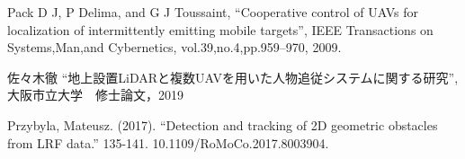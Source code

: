 \documentclass[autodetect-engine,dvipdfmx-if-dvi,ja=standard,a4j,jbase=11pt,magstyle=nomag*]{bxjsreport}
\begin{document}
\begin{thebibliography}{99}
Pack D J, P Delima, and G J Toussaint, ``Cooperative control of UAVs for localization of intermittently emitting mobile targets'', IEEE Transactions on Systems,Man,and Cybernetics, vol.39,no.4,pp.959--970, 2009.

佐々木徹 ``地上設置LiDARと複数UAVを用いた人物追従システムに関する研究'', 大阪市立大学　修士論文，2019

Przybyla, Mateusz. (2017). ``Detection and tracking of 2D geometric obstacles from LRF data.'' 135-141. 10.1109/RoMoCo.2017.8003904. 


\end{thebibliography}
\end{document}
